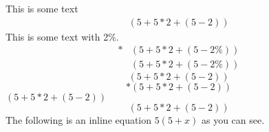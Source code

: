 This is some text
\begin{align}\label{equ1(good)}%
\left(5+5*2+\left(5-2\right)\right)%
\end{align}
This is some text with 2\%.
\begin{align}*
&\left(5+5*2+\left(5-2\%\right)\right)\\
&\left(5+5*2+\left(5-2\%\right)\right)
\end{align}
\begin{equation}\label{equ2(good)}
\left(5+5*2+\left(5-2\right)\right)%
\end{equation}
\begin{equation}*
\left(5+5*2+\left(5-2\right)\right)
\end{equation}
\(\left(5+5*2+\left(5-2\right)\right)\)
\[\left(5+5*2+\left(5-2\right)\right)\]
The following is an inline equation $5\left(5+x\right)$ as you can see.
